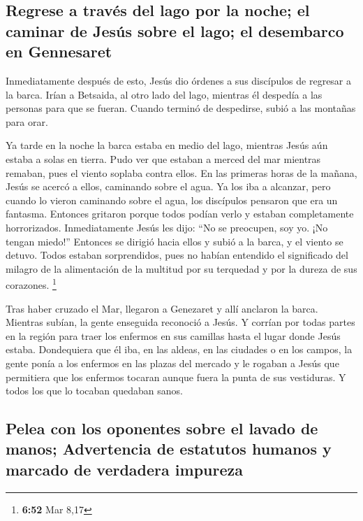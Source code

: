 \hypertarget{regrese-a-travuxe9s-del-lago-por-la-noche-el-caminar-de-jesuxfas-sobre-el-lago-el-desembarco-en-gennesaret}{%
\subsection{Regrese a través del lago por la noche; el caminar de Jesús
sobre el lago; el desembarco en
Gennesaret}\label{regrese-a-travuxe9s-del-lago-por-la-noche-el-caminar-de-jesuxfas-sobre-el-lago-el-desembarco-en-gennesaret}}

 Inmediatamente después de esto, Jesús dio órdenes a sus
discípulos de regresar a la barca. Irían a Betsaida, al otro lado del
lago, mientras él despedía a las personas para que se fueran.
 Cuando terminó de despedirse, subió a las montañas para
orar.

 Ya tarde en la noche la barca estaba en medio del lago,
mientras Jesús aún estaba a solas en tierra.  Pudo ver
que estaban a merced del mar mientras remaban, pues el viento soplaba
contra ellos. En las primeras horas de la mañana, Jesús se acercó a
ellos, caminando sobre el agua. Ya los iba a alcanzar, 
pero cuando lo vieron caminando sobre el agua, los discípulos pensaron
que era un fantasma. Entonces gritaron  porque todos
podían verlo y estaban completamente horrorizados. Inmediatamente Jesús
les dijo: ``No se preocupen, soy yo. ¡No tengan miedo!'' 
Entonces se dirigió hacia ellos y subió a la barca, y el viento se
detuvo. Todos estaban sorprendidos,  pues no habían
entendido el significado del milagro de la alimentación de la multitud
por su terquedad y por la dureza de sus corazones. \footnote{\textbf{6:52}
  Mar 8,17}

 Tras haber cruzado el Mar, llegaron a Genezaret y allí
anclaron la barca.  Mientras subían, la gente enseguida
reconoció a Jesús.  Y corrían por todas partes en la
región para traer los enfermos en sus camillas hasta el lugar donde
Jesús estaba.  Dondequiera que él iba, en las aldeas, en
las ciudades o en los campos, la gente ponía a los enfermos en las
plazas del mercado y le rogaban a Jesús que permitiera que los enfermos
tocaran aunque fuera la punta de sus vestiduras. Y todos los que lo
tocaban quedaban sanos.

\hypertarget{pelea-con-los-oponentes-sobre-el-lavado-de-manos-advertencia-de-estatutos-humanos-y-marcado-de-verdadera-impureza}{%
\subsection{Pelea con los oponentes sobre el lavado de manos;
Advertencia de estatutos humanos y marcado de verdadera
impureza}\label{pelea-con-los-oponentes-sobre-el-lavado-de-manos-advertencia-de-estatutos-humanos-y-marcado-de-verdadera-impureza}}

